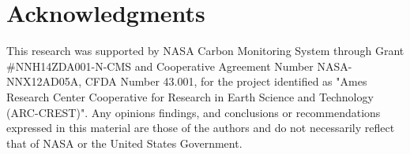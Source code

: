 \documentclass[11pt,a4paper]{article}
\begin{document}
\section{Acknowledgments}
This research was supported by NASA Carbon Monitoring System through Grant \#NNH14ZDA001-N-CMS and Cooperative Agreement Number NASA-NNX12AD05A, CFDA Number 43.001, for the project identified as "Ames Research Center Cooperative for Research in Earth Science and Technology (ARC-CREST)". Any opinions findings, and conclusions or recommendations expressed in this material are those of the authors and do not necessarily reflect that of NASA or the United States Government. 







\end{document}
